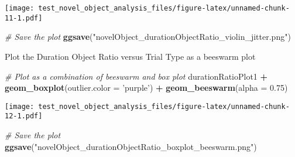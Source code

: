 \documentclass[]{article}
\newenvironment{Shaded}{\begin{snugshade}}{\end{snugshade}}
\newcommand{\KeywordTok}[1]{\textcolor[rgb]{0.13,0.29,0.53}{\textbf{#1}}}
\newcommand{\DataTypeTok}[1]{\textcolor[rgb]{0.13,0.29,0.53}{#1}}
\newcommand{\FloatTok}[1]{\textcolor[rgb]{0.00,0.00,0.81}{#1}}
\newcommand{\StringTok}[1]{\textcolor[rgb]{0.31,0.60,0.02}{#1}}
\newcommand{\CommentTok}[1]{\textcolor[rgb]{0.56,0.35,0.01}{\textit{#1}}}
\newcommand{\OperatorTok}[1]{\textcolor[rgb]{0.81,0.36,0.00}{\textbf{#1}}}
\newcommand{\NormalTok}[1]{#1}
\begin{document}
\texttt{[image: test\_novel\_object\_analysis\_files/figure-latex/unnamed-chunk-11-1.pdf]}

\begin{Shaded}
\begin{Highlighting}[]
\CommentTok{# Save the plot}
\KeywordTok{ggsave}\NormalTok{(}\StringTok{"novelObject_durationObjectRatio_violin_jitter.png"}\NormalTok{)}
\end{Highlighting}
\end{Shaded}

Plot the Duration Object Ratio versus Trial Type as a beeswarm plot

\begin{Shaded}
\begin{Highlighting}[]
\CommentTok{# Plot as a combination of beeswarm and box plot}
\NormalTok{durationRatioPlot1 }\OperatorTok{+}\StringTok{ }\KeywordTok{geom_boxplot}\NormalTok{(}\DataTypeTok{outlier.color =} \StringTok{'purple'}\NormalTok{) }\OperatorTok{+}
\StringTok{    }\KeywordTok{geom_beeswarm}\NormalTok{(}\DataTypeTok{alpha =} \FloatTok{0.75}\NormalTok{)}
\end{Highlighting}
\end{Shaded}

\texttt{[image: test\_novel\_object\_analysis\_files/figure-latex/unnamed-chunk-12-1.pdf]}

\begin{Shaded}
\begin{Highlighting}[]
\CommentTok{# Save the plot}
\KeywordTok{ggsave}\NormalTok{(}\StringTok{"novelObject_durationObjectRatio_boxplot_beeswarm.png"}\NormalTok{)}
\end{Highlighting}
\end{Shaded}
\end{document}
